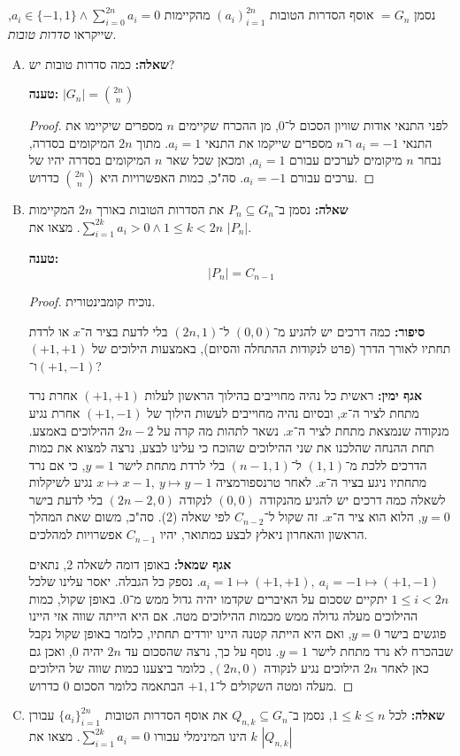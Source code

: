 \documentclass[]{article}
\newcommand\setc[1]   {\{a_i\}^{#1}_{i = 1}}
\newcommand\mto       {\mapsto}
\begin{document}
	\section{} %
	נסמן $=G_n$ אוסף הסדרות הטובות $(a_i)^{2n}_{i = 1}$ מהקיימות $a_i \in \{-1, 1\} \land \sum_{i = 0}^{2n}a_i = 0$, שייקראו \textit{סדרות טובות}. 
	\begin{enumerate}[(A)]
		\item \textbf{שאלה: }כמה סדרות טובות יש? 
		
		\textbf{טענה: }$|G_n| = \binom{2n}{n}$
		
		\begin{proof}
			לפני התנאי אודות שוויון הסכום ל־$0$, מן ההכרח שקיימים $n$ מספרים שיקיימו את התנאי $a_i = -1$ ו‏־$n$ מספרים שייקמו את התנאי $a_i = 1$. מתוך $2n$ המיקומים בסדרה, נבחר $n$ מיקומים לערכים עבורם $a_i = 1$, ומכאן שכל שאר $n$ המיקומים בסדרה יהיו של ערכים עבורם $a_i = -1$. סה"כ, כמות האפשרויות היא $\binom{2n}{n}$ כדרוש. 
		\end{proof}
		\item \textbf{שאלה: }נסמן ב־$P_n \subseteq G_n$ את הסדרות הטובות באורך $2n$ המקיימות $\sum_{i = 1}^{2k} a_i > 0 \land 1 \le k < 2n$. מצאו את $|P_n|$. 
		
		\textbf{טענה: }
		\[ |P_n| = C_{n - 1} \]
		
		\begin{proof}
		נוכיח קומבינטורית. 
		
		\textbf{סיפור: }כמה דרכים יש להגיע מ־$(0, 0)$ ל־$(2n, 1)$ בלי לדעת בציר ה־$x$ או לרדת תחתיו לאורך הדרך (פרט לנקודות ההתחלה והסיום), באמצעות הילוכים של $(+1, +1)$ ו־$(+1, -1)$?
		
		\textbf{אגף ימין: }ראשית כל נהיה מחוייבים בהילוך הראשון לעלות $(+1, +1)$ אחרת נרד מתחת לציר ה־$x$, ובסיום נהיה מחוייבים לעשות הילוך של $(+1, -1)$ אחרת נגיע מנקודה שנמצאת מתחת לציר ה־$x$. נשאר לתהות מה קרה על $2n - 2$ ההילוכים באמצע. תחת ההנחה שהלכנו את שני ההילוכים שהוכח כי עלינו לבצע, נרצה למצוא את כמות הדרכים ללכת מ־$(1, 1)$ ל־$(n - 1, 1)$ בלי לרדת מתחת לישר $y = 1$, כי אם נרד מתחתיו ניגע בציר ה־$x$. לאחר טרנספורמציה $x \mapsto x - 1, \ y \mapsto y - 1$ נגיע לשיקלות לשאלה כמה דרכים יש להגיע מהנקודה $(0, 0)$  לנקודה $(2n - 2, 0)$ בלי לדעת בישר $y = 0$, הלוא הוא ציר ה־$x$. זה שקול ל־$C_{n - 2}$ לפי שאלה (2). סה"כ, משום שאת המהלך הראשון והאחרון ניאלץ לבצע כמתואר, יהיו $C_{n - 1}$ אפשרויות למהלכים. 
		
		\textbf{אגף שמאל: }באופן דומה לשאלה 2, נתאים $a_i = 1 \mto (+1, + 1), \ a_i = -1 \mto (+1, -1)$. נספק כל הגבלה. יאסר עלינו שלכל $1 \le i < 2n$ יתקיים שסכום על האיברים שקדמו יהיה גדול ממש מ־0. באופן שקול, כמות ההילוכים מעלה גדולה ממש מכמות ההילוכים מטה. אם היא הייתה שווה אזי היינו פוגשים בישר $y = 0$, ואם היא הייתה קטנה היינו יורדים תחתיו, כלומר באופן שקול נקבל שבהכרח לא נרד מתחת לישר $y = 1$. נוסף על כך, נרצה שהסכום עד $2n$ יהיה $0$, ואכן גם כאן לאחר $2n$ הילוכים נגיע לנקודה $(2n, 0)$, כלומר ביצענו כמות שווה של הילוכים מעלה ומטה השקולים ל־$+1, 1$ הבתאמה כלומר הסכום $0$ כדרוש. 
		\end{proof}
		\item \textbf{שאלה: }לכל $1 \le k \le n$, נסמן ב־$Q_{n, k} \subseteq G_n$ את אוסף הסדרות הטובות $\setc{2n}$ עבורן $k$ הינו המינימלי עבורו $\sum_{i = 1}^{2k}a_i = 0$. מצאו את $|Q_{n, k}|$
		

\end{enumerate}
\end{document}
